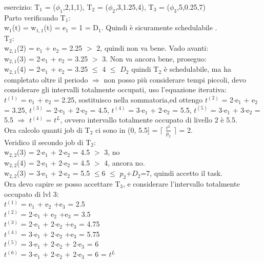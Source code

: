 \documentclass[12pt, oneside]{extbook}
\begin{document}
esercizio:
T$_{1}$ = ($\phi_{1}$,2,1,1), T$_{2}$ = ($\phi_{2}$,3,1.25,4), T$_{3}$ = ($\phi_{3}$,5,0.25,7)\\ Parto verificando T$_{1}$: \\w$_{1}$(t) = w$_{1,1}$(t) = e$_{1}$ = 1 = D$_{1}$. Quindi è sicuramente schedulabile . \\T$_{2}$:\\
w$_{2,1}$(2) = e$_{1}$ + e$_{2}$ = 2.25 $>$ 2, quindi non va bene. Vado avanti: \\
w$_{2,1}$(3) = 2$\cdot$e$_{1}$ + e$_{2}$ = 3.25 $>$ 3. Non va ancora bene, proseguo: \\
w$_{2,1}$(4) = 2$\cdot$e$_{1}$ + e$_{2}$ = 3.25 $\leq$ 4 $\leq$ $D_{2}$ quindi T$_{2}$ è schedulabile, ma ha completato oltre il periodo $\Rightarrow$ non posso più considerare tempi piccoli, devo considerare gli intervalli totalmente occupati, uso l'equazione iterativa:\\
$t^(1)$ = e$_{1}$ + e$_{2}$ = 2.25, sostituisco nella sommatoria,ed ottengo $t^(2)$ = 2$\cdot$e$_{1}$ + e$_{2}$ = 3.25, $t^(3)$ = 2$\cdot$e$_{1}$ + 2$\cdot$e$_{2}$ = 4.5, $t^(4)$ = 3$\cdot$e$_{1}$ + 2$\cdot$e$_{2}$ = 5.5, $t^(5)$ = 3$\cdot$e$_{1}$ + 3$\cdot$e$_{2}$ = 5.5 $\Rightarrow$ $t^(4)$ = $t^L$, ovvero intervallo totalmente occupato di livello 2 è 5.5.\\ Ora calcolo quanti job di T$_{2}$ ci sono in (0, 5.5] = $\lceil$ $\frac{t^L}{p_{2}}$ $\rceil$ = 2.\\ Veridico il secondo job di T$_{2}$:\\
w$_{2,2}$(3) = 2$\cdot$e$_{1}$ + 2$\cdot$e$_{2}$ = 4.5 $>$ 3, no\\
w$_{2,2}$(4) = 2$\cdot$e$_{1}$ + 2$\cdot$e$_{2}$ = 4.5 $>$ 4, ancora no.\\
w$_{2,2}$(3) = 3$\cdot$e$_{1}$ + 2$\cdot$e$_{2}$ = 5.5 $\leq$6 $\leq$ $p_{2}$+$D_{2}$=7, quindi accetto il task.\\ Ora devo capire  se posso accettare T$_{3}$, e considerare l'intervallo totalmente occupato di lvl 3:\\ 
$t^(1)$ = e$_{1}$ + e$_{2}$ +e$_{3}$ = 2.5\\
$t^(2)$ = 2$\cdot$e$_{1}$ + e$_{2}$ +e$_{3}$ = 3.5\\
$t^(3)$ = 2$\cdot$e$_{1}$ + 2$\cdot$e$_{2}$ +e$_{3}$ = 4.75\\
$t^(4)$ = 3$\cdot$e$_{1}$ + 2$\cdot$e$_{2}$ +e$_{3}$ = 5.75\\
$t^(5)$ = 3$\cdot$e$_{1}$ + 2$\cdot$e$_{2}$ + 2$\cdot$e$_{3}$ = 6\\
$t^(6)$ = 3$\cdot$e$_{1}$ + 2$\cdot$e$_{2}$ + 2$\cdot$e$_{3}$ = 6 = $t^L$\\
\end{document}
